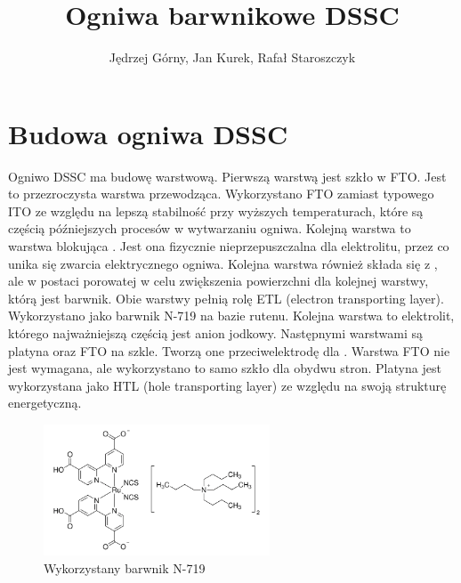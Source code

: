 \documentclass[12pt]{article}
\title{Ogniwa barwnikowe DSSC}
\author{Jędrzej Górny, Jan Kurek, Rafał Staroszczyk}
\date{}
\begin{document}
	\maketitle
	\section{Budowa ogniwa DSSC}
	Ogniwo DSSC ma budowę warstwową. Pierwszą warstwą jest szkło w FTO. Jest to przezroczysta warstwa przewodząca. Wykorzystano FTO zamiast typowego ITO ze względu na lepszą stabilność przy wyższych temperaturach, które są częścią późniejszych procesów w wytwarzaniu ogniwa. Kolejną warstwa to warstwa blokująca . Jest ona fizycznie nieprzepuszczalna dla elektrolitu, przez co unika się zwarcia elektrycznego ogniwa. Kolejna warstwa również składa się z , ale w postaci porowatej w celu zwiększenia powierzchni dla kolejnej warstwy, którą jest barwnik. Obie warstwy  pełnią rolę ETL (electron transporting layer). Wykorzystano jako barwnik N-719 na bazie rutenu. Kolejna warstwa to elektrolit, którego najważniejszą częścią jest anion jodkowy. Następnymi warstwami są platyna oraz FTO na szkle. Tworzą one przeciwelektrodę dla . Warstwa FTO nie jest wymagana, ale wykorzystano to samo szkło dla obydwu stron. Platyna jest wykorzystana jako HTL (hole transporting layer) ze względu na swoją strukturę energetyczną. 
	\begin{figure}[H]
		\centering
		\includegraphics[width=0.6\textwidth]{n719.png}
		\caption{Wykorzystany barwnik N-719}
	\end{figure}
	
\end{document}
